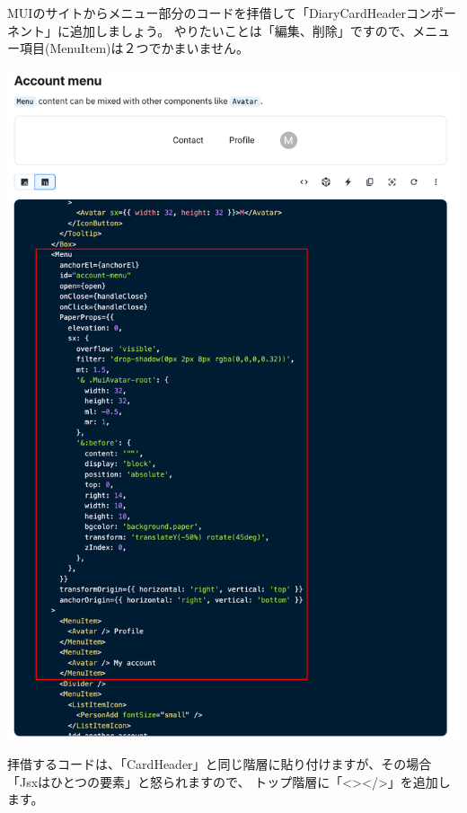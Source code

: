 MUIのサイトからメニュー部分のコードを拝借して「DiaryCardHeaderコンポーネント」に追加しましょう。
やりたいことは「編集、削除」ですので、メニュー項目(MenuItem)は２つでかまいません。


\clearpage

\begin{reviewimage}%
\includegraphics[width=0.7\maxwidth]{./images/03-todo-with-react/mui011-card-MenuCode.png}%
\label{image:03-todo-with-react:mui011-card-MenuCode}
\end{reviewimage}

拝借するコードは、「CardHeader」と同じ階層に貼り付けますが、その場合「Jsxはひとつの要素」と怒られますので、
トップ階層に「\textless{}\textgreater{}\textless{}/\textgreater{}」を追加します。


